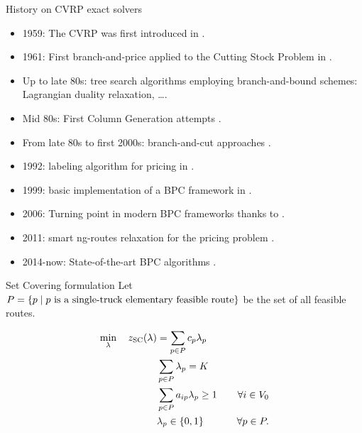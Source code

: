 \begin{frame}{History on CVRP exact solvers}
	\begin{itemize}
		\item 1959: The CVRP was first introduced in \cite{dantzig1959}.
		\item 1961: First branch-and-price applied to the Cutting Stock Problem in \cite{gilmore1961}.
		\item Up to late 80s: tree search algorithms employing branch-and-bound schemes: Lagrangian duality relaxation, \dots.
		\item Mid 80s: First Column Generation attempts \parencite{desrosiers1984, agarwal1989setpartitioningbased}.
		\item From late 80s to first 2000s: branch-and-cut approaches \cite{laporte1983, laporte1985, augerat1995approche, araqueg1994, augerat1995, achuthan1996, blasum2000, ralphs2003, achuthan2003, baldacci2004}.
		\item 1992: labeling algorithm for pricing in \cite{desrochers1992}.
		\item 1999: basic implementation of a BPC framework in \cite{kohl1999}.
		\item 2006: Turning point in modern BPC frameworks thanks to \parencite{fukasawa2006}.
		\item 2011: smart ng-routes relaxation for the pricing problem \parencite{baldacci2011}.
		\item 2014-now: State-of-the-art BPC algorithms \parencite{contardo2014,pecin2017improved,pecin2017new,pessoa2020,sadykov2021,pessoa2020generic}.
	\end{itemize}
\end{frame}

\begin{frame}{Set Covering formulation}
	Let $P = \Set*{p \mid p\ \text{is a single-truck elementary feasible route}}$ be the set of all feasible routes.

	\begin{align}
		\min_{\lambda} \quad z_\mt{SC}(\lambda) & = \sum_{p \in P}  c_p \lambda_p              & \label{eq:set-covering-obj-func}                                                       \\
		                                        & \sum_{p \in P} \lambda_{p} = K               & \label{eq:set-covering-K-routes}                                                       \\
		                                        & \sum_{p \in P}  a_{ip} \lambda_p \ge 1       & \quad \forall i \in V_0 \label{eq:set-covering-customers-visited-by-exactly-one-route} \\
		                                        & \lambda_p                    \in \Set*{0, 1} & \quad \forall p \in P \label{eq:set-covering-lambda-mip-var-bounds}.
	\end{align}
\end{frame}

